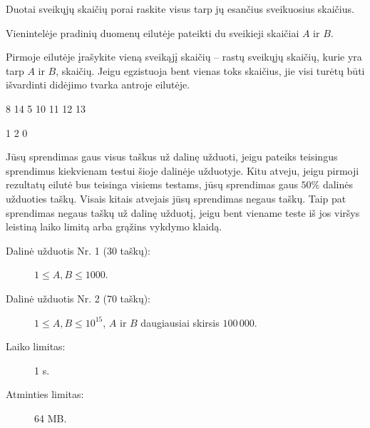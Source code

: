 \documentclass{boi2014-lt}
\begin{document}
    Duotai sveikųjų skaičių porai raskite visus tarp jų esančius sveikuosius
    skaičius.

    \Input
    Vienintelėje pradinių duomenų eilutėje pateikti du sveikieji skaičiai
    $A$ ir $B$.

    \Output
    Pirmoje eilutėje įrašykite vieną sveikąjį skaičių -- rastų sveikųjų skaičių,
    kurie yra tarp $A$ ir $B$, skaičių. Jeigu egzistuoja bent vienas toks
    skaičius, jie visi turėtų būti išvardinti didėjimo tvarka antroje eilutėje.
    
    \Examples

    \simpleexample
    {
        8 14
    }
    {
        5  10 11 12 13
    }

    \simpleexample
    {
        1 2
    }
    {
        0
    }

    \Scoring
    Jūsų sprendimas gaus visus taškus už dalinę užduoti, jeigu pateiks teisingus
    sprendimus kiekvienam testui šioje dalinėje užduotyje. Kitu atveju, jeigu
    pirmoji rezultatų eilutė bus teisinga visiems testams, jūsų sprendimas gaus
    $50\%$ dalinės užduoties taškų. Visais kitais atvejais jūsų sprendimas negaus
    taškų. Taip pat sprendimas negaus taškų už dalinę užduotį, jeigu bent viename
    teste iš jos viršys leistiną laiko limitą arba grąžins vykdymo klaidą.

    \begin{description}

        \item[Dalinė užduotis Nr. 1 (30 taškų):] $1 \le A, B \le 1000$. 
        \item[Dalinė užduotis Nr. 2 (70 taškų):] $1 \le A, B \le 10^{15}$,
            $A$ ir $B$ daugiausiai skirsis $100\,000$.
    \end{description}

    \Constraints

    \begin{description}
        \item[Laiko limitas:] 1 s.
        \item[Atminties limitas:] 64 MB.
    \end{description}
\end{document}
